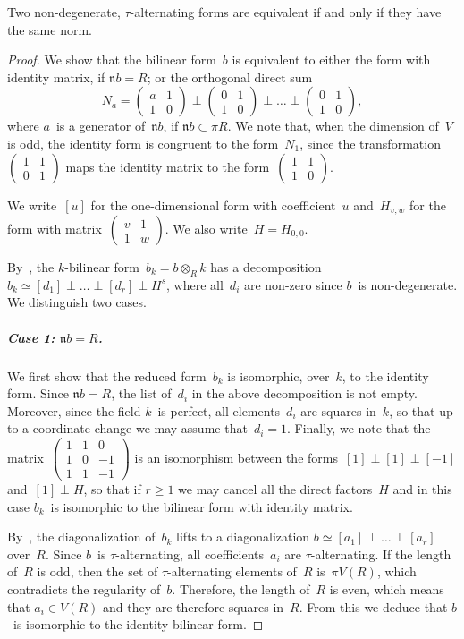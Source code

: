 \documentclass{lms}
\let\fr\mathfrak
\def\mat#1{\begin{pmatrix}#1\end{pmatrix}}
\begin{document}
\begin{prop}\label{prop:eqv-norm}
Two non-degenerate, $τ$-alternating forms are equivalent if and only
if they have the same norm.
\end{prop}
\begin{proof}
We show that the bilinear form~$b$ is equivalent to either the form with
identity matrix, if $\fr n b = R$; or the orthogonal direct sum
\[ N_a = \mat{a & 1\\1&0} ⟂ \mat{0 & 1\\1&0} ⟂ … ⟂ \mat {0 & 1\\ 1 & 0}, \]
where $a$~is a generator of~$\fr n b$, if $\fr n b ⊂ π R$.
We note that, when the dimension of~$V$ is odd, the identity form is
congruent to the form~$N_1$, since the transformation~$\mat{1&1\\0&1}$
maps the identity matrix to the form~$\mat{1&1\\1&0}$.

We write~$[u]$ for the one-dimensional form with coefficient~$u$
and~$H_{v, w}$ for the form with matrix~$\mat{v&1\\1&w}$.
We also write~$H = H_{0,0}$.

By~\cite[§2]{milnor2}, the $k$-bilinear form~$b_k = b ⊗_R k$ has a
decomposition~$b_k ≃ [d_1] ⟂ … ⟂ [d_r] ⟂ H^s$, where all~$d_i$ are
non-zero since $b$~is non-degenerate. We distinguish two cases.

\subparagraph{Case 1: $\fr n b = R$.}
We first show that the reduced form~$b_k$ is isomorphic, over~$k$, to the
identity form. Since $\fr n b = R$, the list of~$d_i$ in the above
decomposition is not empty. Moreover, since the field $k$~is perfect, all
elements~$d_i$ are squares in~$k$, so that up to a coordinate change we
may assume that~$d_i = 1$. Finally, we note that the
matrix~$\mat{1&1&0\\1&0&-1\\1&1&-1}$ is an isomorphism between the
forms~$[1] ⟂ [1] ⟂ [-1]$ and~$[1] ⟂ H$, so that if $r ≥ 1$ we may cancel
all the direct factors~$H$ and in this case $b_k$~is isomorphic to the
bilinear form with identity matrix.

By~\cite[Corollary 3.4]{baeza1978quadratic},
the diagonalization of~$b_k$ lifts to a diagonalization
$b ≃ [a_1] ⟂ … ⟂ [a_r]$ over~$R$.
Since $b$~is $τ$-alternating, all coefficients~$a_i$ are $τ$-alternating.
If the length of~$R$ is odd, then the set of $τ$-alternating elements of~$R$
is~$π V(R)$, which contradicts the regularity of~$b$.
Therefore, the length of~$R$ is even, which means that $a_i ∈ V(R)$ and they are
therefore squares in~$R$.
From this we deduce that $b$~is isomorphic to the identity bilinear form.


\end{proof}
\end{document}
